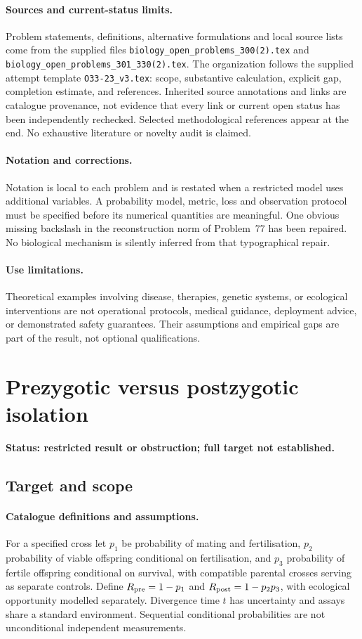 \documentclass[11pt]{article}
\begin{document}
\paragraph{Sources and current-status limits.}
Problem statements, definitions, alternative formulations and local source lists
come from the supplied files
\texttt{biology\_open\_problems\_300(2).tex} and
\texttt{biology\_open\_problems\_301\_330(2).tex}.
The organization follows the supplied attempt template
\texttt{O33-23\_v3.tex}: scope, substantive calculation, explicit gap,
completion estimate, and references. Inherited source annotations and links are
catalogue provenance, not evidence that every link or current open status has
been independently rechecked. Selected methodological references appear at the
end. No exhaustive literature or novelty audit is claimed.

\paragraph{Notation and corrections.}
Notation is local to each problem and is restated when a restricted model uses
additional variables. A probability model, metric, loss and observation protocol
must be specified before its numerical quantities are meaningful. One obvious
missing backslash in the reconstruction norm of Problem~77 has been repaired.
No biological mechanism is silently inferred from that typographical repair.

\paragraph{Use limitations.}
Theoretical examples involving disease, therapies, genetic systems, or ecological
interventions are not operational protocols, medical guidance, deployment advice,
or demonstrated safety guarantees. Their assumptions and empirical gaps are part
of the result, not optional qualifications.


\section*{Prezygotic versus postzygotic isolation}
\label{prob:147}
\noindent\textbf{Status: restricted result or obstruction; full target not established.}
\subsection{Target and scope}
\paragraph{Catalogue definitions and assumptions.}
For a specified cross let $p_1$ be probability of mating and fertilisation, $p_2$ probability of viable offspring conditional on fertilisation, and $p_3$ probability of fertile offspring conditional on survival, with compatible parental crosses serving as separate controls. Define $R_{\rm pre}=1-p_1$ and $R_{\rm post}=1-p_2p_3$, with ecological opportunity modelled separately. Divergence time $t$ has uncertainty and assays share a standard environment. Sequential conditional probabilities are not unconditional independent measurements.
\end{document}
